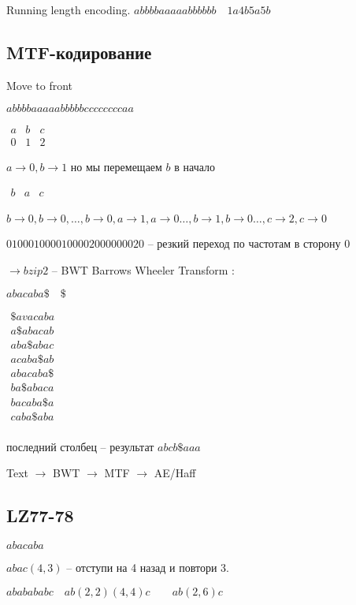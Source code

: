 \documentclass{book}
\theoremstyle{definition}
\begin{document}
   Running length encoding. $abbbbaaaaabbbbbb\quad 1a4b5a5b$
   \subsection{MTF-кодирование}
   Move to front

   $abbbbaaaaabbbbbccccccccaa$

   $\begin{array}{ccc}
       a&b&c\\0&1&2
   \end{array}$

   $a\to 0, b\to 1$ но мы перемещаем $b$  в начало

    $\begin{array}{ccc}
        b&a&c\\
    \end{array}$ 
    
    $b\to 0, b\to 0, \ldots, b\to 0, a\to 1, a\to 0 \ldots,b\to 1, b\to 0\ldots,c\to 2,c\to 0$

    $0100010000100002000000020$ -- резкий переход по частотам в сторону  $0$

     $\to bzip2$ -- BWT Barrows Wheeler Transform :

     $abacaba\$\quad \$$ 

      $\begin{array}{c}
          \$avacaba\\
          a\$abacab\\
          aba\$abac\\
          acaba\$ab\\
          abacaba\$\\
          ba\$abaca\\
          bacaba\$a\\
          caba\$aba\\
      \end{array}$

      последний столбец -- результат $abcb\$aaa$ 


      Text $\to $ BWT $\to $ MTF $\to $ AE/Haff

      \subsection{LZ77-78}

      $abacaba$

      $abac(4,3)$ -- отступи на 4 назад и повтори 3.

      $ababababc\quad ab(2,2)(4,4)c\qquad ab(2,6)c$
\end{document}
